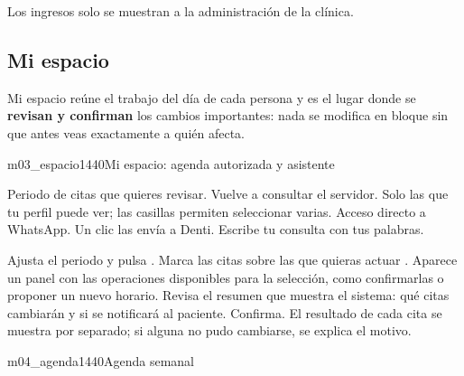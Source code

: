 \documentclass[11pt]{article}
\begin{document}
\begin{sdpermiso}
Los ingresos solo se muestran a la administración de la clínica.
\end{sdpermiso}

\needspace{0.55\textheight}
\subsection{Mi espacio}\label{sec:espacio}

Mi espacio reúne el trabajo del día de cada persona y es el lugar donde se \textbf{revisan y confirman} los cambios importantes: nada se modifica en bloque sin que antes veas exactamente a quién afecta.

\begin{pantalla}{m03_espacio}{1440}{Mi espacio: agenda autorizada y asistente}
\end{pantalla}

\begin{leyenda}
   Periodo de citas que quieres revisar.
   Vuelve a consultar el servidor.
   Solo las que tu perfil puede ver; las casillas permiten seleccionar varias.
   Acceso directo a WhatsApp.
   Un clic las envía a Denti.
   Escribe tu consulta con tus palabras.
\end{leyenda}

\begin{pasos}
  \paso Ajusta el periodo  y pulsa  .
  \paso Marca las citas sobre las que quieras actuar . Aparece un panel con las operaciones disponibles para la selección, como confirmarlas o proponer un nuevo horario.
  \paso Revisa el resumen que muestra el sistema: qué citas cambiarán y si se notificará al paciente.
  \paso Confirma. El resultado de cada cita se muestra por separado; si alguna no pudo cambiarse, se explica el motivo.
\end{pasos}

\label{sec:agenda}


\begin{pantalla}{m04_agenda}{1440}{Agenda semanal}
\end{pantalla}
\end{document}
